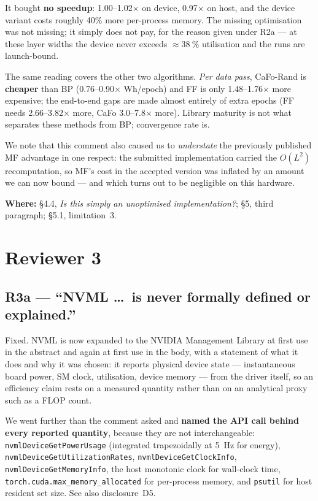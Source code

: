 \documentclass[11pt,a4paper]{article}
\newcommand{\tmma}{\texttt{torch.cuda.\allowbreak max\_memory\_\allowbreak allocated}}
\newcommand{\FF}{FF}
\newcommand{\MF}{MF}
\newcommand{\BP}{BP}
\newcommand{\CaFo}{CaFo}
\newcommand{\CaFoRand}{CaFo-Rand}
\newcommand{\where}[1]{\par\smallskip\noindent\textbf{Where:} #1\par}
\begin{document}
It bought \textbf{no speedup}: \numrange{1.00}{1.02}$\times$ on device,
\num{0.97}$\times$ on host, and the device variant costs roughly \num{40}\%
more per-process memory. The missing optimisation was not missing; it simply
does not pay, for the reason given under R2a --- at these layer widths the
device never exceeds ${\approx}\SI{38}{\percent}$ utilisation and the runs are
launch-bound.

The same reading covers the other two algorithms. \emph{Per data pass},
\CaFoRand{} is \textbf{cheaper} than \BP{} (\numrange{0.76}{0.90}$\times$
Wh/epoch) and \FF{} is only \numrange{1.48}{1.76}$\times$ more expensive; the
end-to-end gaps are made almost entirely of extra epochs (\FF{} needs
\numrange{2.66}{3.82}$\times$ more, \CaFo{} \numrange{3.0}{7.8}$\times$ more).
Library maturity is not what separates these methods from \BP{}; convergence
rate is.

We note that this comment also caused us to \emph{understate} the previously
published \MF{} advantage in one respect: the submitted implementation carried
the $O(L^2)$ recomputation, so \MF{}'s cost in the accepted version was
inflated by an amount we can now bound --- and which turns out to be
negligible on this hardware.

\where{\S4.4, \emph{Is this simply an unoptimised implementation?}; \S5,
third paragraph; \S5.1, limitation~3.}

\section*{Reviewer 3}

\subsection*{R3a --- ``NVML \dots\ is never formally defined or explained.''}

Fixed. NVML is now expanded to the NVIDIA Management Library at first use in
the abstract and again at first use in the body, with a statement of what it
does and why it was chosen: it reports physical device state --- instantaneous
board power, SM clock, utilisation, device memory --- from the driver itself,
so an efficiency claim rests on a measured quantity rather than on an
analytical proxy such as a FLOP count.

We went further than the comment asked and \textbf{named the API call behind
every reported quantity}, because they are not interchangeable:
\texttt{nvmlDeviceGetPowerUsage} (integrated trapezoidally at \SI{5}{\hertz}
for energy), \texttt{nvmlDeviceGetUtilizationRates},
\texttt{nvmlDeviceGetClockInfo}, \texttt{nvmlDeviceGetMemoryInfo}, the host
monotonic clock for wall-clock time, \tmma{}
for per-process memory, and \texttt{psutil} for host resident set size. See
also disclosure~D5.
\end{document}
